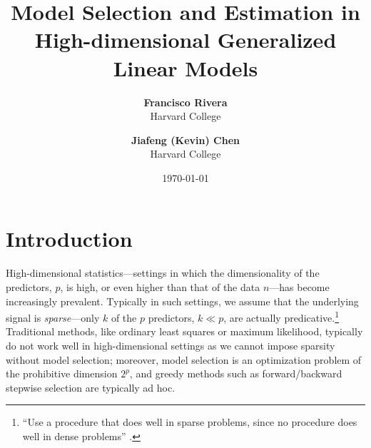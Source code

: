 \documentclass[letterpaper, 12pt]{article}
\begin{document}
\title{\textbf{Model Selection and Estimation in High-dimensional
Generalized Linear Models}}
\author{\textbf{Francisco Rivera} \\ Harvard College \and \textbf{Jiafeng (Kevin) Chen} \\ Harvard College}
\date{\today}

\maketitle
\doublespacing
\section{Introduction}
\label{sec:intro}
High-dimensional statistics---settings in which the dimensionality of the
predictors, $p$, is high, or even higher than that of the data $n$---has become
increasingly prevalent. Typically in such settings, we assume that the
underlying signal is \emph{sparse}---only $k$ of the $p$ predictors, $k \ll p$,
are actually predicative.\footnote{``Use a procedure that does well in sparse
problems, since no procedure does well in dense problems'' 
\citep{hastie2015statistical}.} Traditional methods, like ordinary least squares
or maximum likelihood, typically do not work well in high-dimensional settings
as we cannot impose sparsity without model selection; moreover, model selection
is an
optimization problem of the prohibitive dimension $2^p$, and greedy methods such
as forward/backward stepwise selection are typically ad hoc. 
\end{document}
